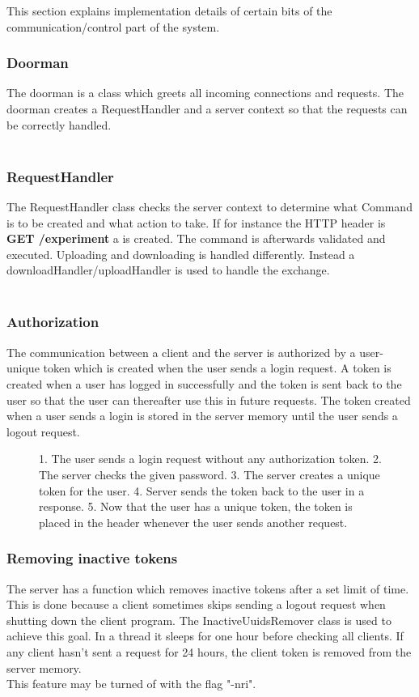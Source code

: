 This section explains implementation details of certain bits of the communication/control part of the system.
\subsubsection{Doorman}
The doorman is a class which greets all incoming connections and requests. The doorman creates a RequestHandler and a server context so that the requests can be correctly handled.\\
\\
\subsubsection{RequestHandler}
The RequestHandler class checks the server context to determine what Command is to be created and what action to take. If for instance the HTTP header is \textbf{GET /experiment} a  is created. The command is afterwards validated and executed. Uploading and downloading is handled differently. Instead a downloadHandler/uploadHandler is used to handle the exchange.\\
\\
\subsubsection{Authorization}
The communication between a client and the server is authorized by a user-unique token which is created when the user sends a login request. A token is created when a user has logged in successfully and the token is sent back to the user so that the user can thereafter use this in future requests. The token created when a user sends a login is stored in the server memory until the user sends a logout request.
\begin{figure}[h]
\caption{1. The user sends a login request without any authorization token. 2. The server checks the given password. 3. The server creates a unique token for the user. 4. Server sends the token back to the user in a response. 5. Now that the user has a unique token, the token is placed in the header whenever the user sends another request.}
\label{fig:com_authorization}
\end{figure}
\subsubsection{Removing inactive tokens}
The server has a function which removes inactive tokens after a set limit of time. This is done because a client sometimes skips sending a logout request when shutting down the client program. The InactiveUuidsRemover class is used to achieve this goal. In a thread it sleeps for one hour before checking all clients. If any client hasn't sent a request for 24 hours, the client token is removed from the server memory. 
\\
This feature may be turned of with the flag "-nri".
